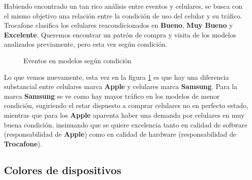 \documentclass[a4paper]{article}
\begin{document}
Habiendo encontrado un tan rico análisis entre eventos y celulares, se busca con el mismo objetivo una relación entre la condición de uso del celular y su tráfico. Trocafone clasifica los celulares reacondicionados en \textbf{Bueno}, \textbf{Muy Bueno} y \textbf{Excelente}. Queremos encontrar un patrón de compra y visita de los modelos analizados previamente, pero esta vez según condición.

\begin{figure}[h!]
	\caption{Eventos en modelos según condición}
	\label{fig:prominentescondicion}
\end{figure}

Lo que vemos nuevamente, esta vez en la figura \ref{fig:prominentescondicion} es que hay una diferencia substancial entre celulares marca \textbf{Apple} y celulares marca \textbf{Samsung}. Para la marca \textbf{Samsung} se ve como hay mayor tráfico en los modelos de menor condición, sugiriendo el estar dispuesto a comprar celulares no en perfecto estado, mientras que para los \textbf{Apple} aparenta haber una demanda por celulares en muy buena condición, insinuando que se quiere excelencia tanto en calidad de software (responsabilidad de \textbf{Apple}) como en calidad de hardware (responsabilidad de \textbf{Trocafone}).

\subsection{Colores de dispositivos}
\end{document}
